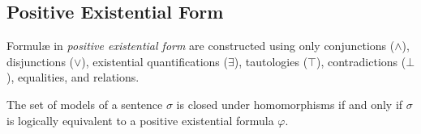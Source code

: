 	\subsection{Positive Existential Form}

		Formul{\ae} in \emph{positive existential form} are constructed using
		only conjunctions ($\wedge$), disjunctions ($\vee$), existential
		quantifications ($\exists$), tautologies ($\top$), contradictions
		($\bot$), equalities, and relations.

		\begin{theorem}
			\label{pef_theorem}
			The set of models of a sentence $\sigma$ is closed under homomorphisms
			if and only if $\sigma$ is logically equivalent to a positive
			existential formula $\varphi$.
		\end{theorem}


